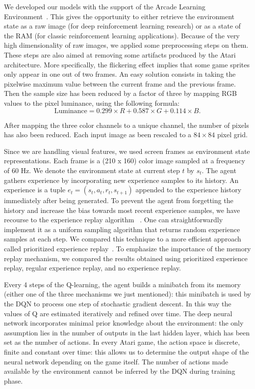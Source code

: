 \documentclass[letterpaper]{article}
\begin{document}
We developed our models with the support of the Arcade Learning Environment~\citep{bellemare13arcade}. This gives the opportunity to either
retrieve the environment state as a raw image (for deep reinforcement learning research) or as a state of the RAM (for classic reinforcement learning
applications). Because of the very high dimensionality of raw images, we applied some preprocessing steps on them. These steps are also aimed at
removing some artifacts produced by the Atari architecture. More specifically, the flickering effect implies that some game sprites only appear
in one out of two frames. An easy solution consists in taking the pixelwise maximum value between the current frame and the previous frame.
Then the sample size has been reduced by a factor of three by mapping RGB values to the pixel luminance, using the following formula:
\begin{equation}
    \text{Luminance} = 0.299 \times R + 0.587 \times G + 0.114 \times B.
\end{equation}

After mapping the three color channels to a unique channel, the number of pixels has also been reduced. Each input image as been rescaled to a
$84 \times 84$ pixel grid.

Since we are handling visual features, we used screen frames as environment state representations. Each frame is a (210 x 160) color image sampled at
a frequency of 60 Hz. We denote the environment state at current step $t$ by $s_t$. The agent gathers experience by incorporating new experience samples
to its history. An experience is a tuple $e_t = (s_t, a_t, r_t, s_{t+1})$ appended to the experience history immediately after being generated.
To prevent the agent from forgetting the history and increase the bias towards most recent experience samples, we have recourse to the experience
replay algorithm ~\citep{adam2012experience}. One can straightforwardly implement it as a uniform sampling algorithm that returns random experience samples at each step.
We compared this technique to a more efficient approach called prioritized experience replay~\citep{DBLP:journals/corr/SchaulQAS15}.
To emphasize the importance of the memory replay mechanism, we compared the results obtained using prioritized experience replay, regular
experience replay, and no experience replay.

Every 4 steps of the Q-learning, the agent builds a minibatch from its memory (either one of the three mechanisms we just mentioned):
this minibatch is used by the DQN to process one step of stochastic gradient descent. In this way the values of Q are estimated iteratively and
refined over time. The deep neural network incorporates minimal prior knowledge about the environment: the only assumption lies in the number of
outputs in the last hidden layer, which has been set as the number of actions. In every Atari game, the action space is discrete, finite and constant over time:
this allows us to determine the output shape of the neural network depending on the game itself. The number of actions made available by the environment
cannot be inferred by the DQN during training phase.
\end{document}
